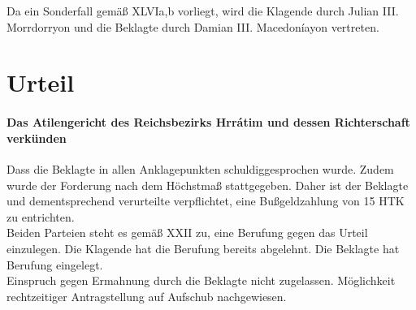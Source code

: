 \documentclass{article}
\begin{document}
Da ein Sonderfall gemäß XLVIa,b vorliegt, wird die Klagende durch Julian III. Morrdorryon und die Beklagte durch Damian III. Macedoníayon vertreten.

\newpage
\section{Urteil}
\paragraph{Das Atilengericht des Reichsbezirks Hrrátim und dessen Richterschaft verkünden\\}
Dass die Beklagte in allen Anklagepunkten schuldiggesprochen wurde. Zudem wurde der Forderung nach dem
Höchstmaß stattgegeben. Daher ist der Beklagte und dementsprechend verurteilte verpflichtet,
eine Bußgeldzahlung von 15 HTK zu entrichten.\\
Beiden Parteien steht es gemäß XXII zu, eine Berufung gegen das Urteil einzulegen. Die Klagende hat die Berufung bereits
abgelehnt. Die Beklagte hat Berufung eingelegt.\\
Einspruch gegen Ermahnung durch die Beklagte nicht zugelassen. Möglichkeit rechtzeitiger Antragstellung auf Aufschub nachgewiesen.
\end{document}
